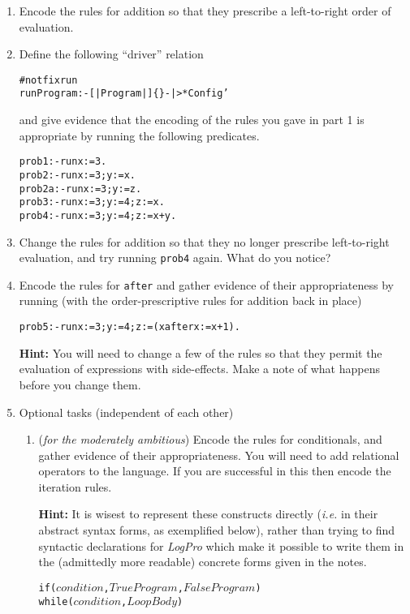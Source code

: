 \documentclass{article}
\def\LOGPRO{{\ttfamily\slshape LogPro}\xspace}
\newenvironment{smalltt}{\begin{small}\begin{alltt}}{\end{alltt}\end{small}}
\begin{document}
\begin{enumerate}
\item 
Encode the rules for addition so that they prescribe a left-to-right
order of evaluation.
\item 
Define the following ``driver'' relation
\begin{smalltt}
    #notfix run
    run Program :- [| Program |] \{\} -|>* Config'
\end{smalltt}
and give evidence that the encoding of the rules you gave in part 1 
is appropriate  by
running the following predicates.
\begin{smalltt}
        prob1  :- run x:=3 .
        prob2  :- run x:=3; y:=x .
        prob2a :- run x:=3; y:=z .
        prob3  :- run x:=3; y:=4; z:=x .
        prob4  :- run x:=3; y:=4; z:=x+y .
\end{smalltt}
\item 
Change the rules for addition so that they no longer prescribe left-to-right
evaluation, and try running {\tt prob4} again. What do you notice?


\item 
Encode the rules for {\tt after} and gather evidence of their
appropriateness by running (with the order-prescriptive rules for
addition back in place)
\begin{smalltt}
        prob5 :- run x:=3; y:=4; z:=(x after x:=x+1) .
\end{smalltt}
{\bf Hint:} You will  need to change a few of the rules so that they permit
the evaluation of expressions with side-effects. Make a
note of what happens before you change them.

\item Optional tasks (independent of each other)
\begin{enumerate}
\item ({\it for the moderately ambitious\/})
Encode the rules for conditionals, and gather evidence of
their appropriateness. You will need to add relational operators
to the language. If you are successful in this then encode the iteration rules.

{\bf Hint:}  It is wisest to represent these constructs directly ({\it i.e.} in their
abstract syntax forms, as exemplified below), rather than trying to 
find  syntactic declarations for \LOGPRO which make it possible to write them in
the (admittedly more readable) concrete forms given in the notes.
\begin{smalltt}
        if(\(condition\), \(TrueProgram\), \(FalseProgram\))
        while(\(condition\), \(LoopBody\))
\end{smalltt}


\end{enumerate}
\end{enumerate}
\end{document}
